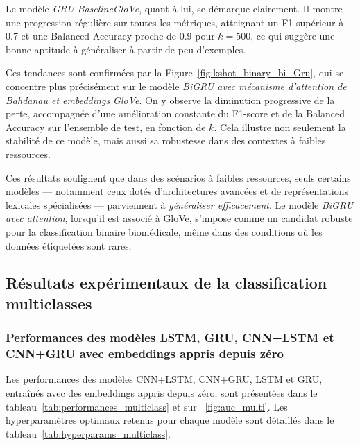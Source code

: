 \documentclass[12pt]{report}
\begin{document}
Le modèle \textit{GRU-BaselineGloVe}, quant à lui, se démarque clairement. Il montre une progression régulière sur toutes les métriques, atteignant un F1 supérieur à 0.7 et une Balanced Accuracy proche de 0.9 pour $k=500$, ce qui suggère une bonne aptitude à généraliser à partir de peu d’exemples.

Ces tendances sont confirmées par la Figure~\ref{fig:kshot_binary_bi_Gru}, qui se concentre plus précisément sur le modèle \textit{BiGRU avec mécanisme d’attention de Bahdanau et embeddings GloVe}. On y observe la diminution progressive de la perte, accompagnée d’une amélioration constante du F1-score et de la Balanced Accuracy sur l’ensemble de test, en fonction de $k$. Cela illustre non seulement la stabilité de ce modèle, mais aussi sa robustesse dans des contextes à faibles ressources.

Ces résultats soulignent que dans des scénarios à faibles ressources, seuls certains modèles — notamment ceux dotés d’architectures avancées et de représentations lexicales spécialisées — parviennent à \textit{généraliser efficacement}. Le modèle \textit{BiGRU avec attention}, lorsqu’il est associé à GloVe, s’impose comme un candidat robuste pour la classification binaire biomédicale, même dans des conditions où les données étiquetées sont rares.

\subsection{Résultats expérimentaux de la classification multiclasses}

\subsubsection{Performances des modèles LSTM, GRU, CNN+LSTM et CNN+GRU avec embeddings appris depuis zéro}

Les performances des modèles CNN+LSTM, CNN+GRU, LSTM et GRU, entraînés avec des embeddings appris depuis zéro, sont présentées dans le tableau~\ref{tab:performances_multiclass} et sur ~\ref{fig:auc_multi}. Les hyperparamètres optimaux retenus pour chaque modèle sont détaillés dans le tableau~\ref{tab:hyperparams_multiclass}.
\end{document}
